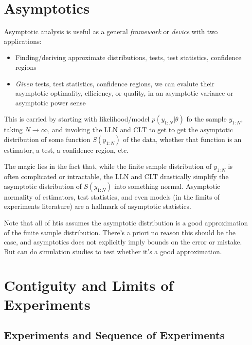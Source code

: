 \documentclass[12pt]{article}
\theoremstyle{plain}
\theoremstyle{definition}
\theoremstyle{remark}
\newcommand{\ra}{\rightarrow}
\begin{document}
\clearpage
\section{Asymptotics}

Asymptotic analysis is useful as a general \emph{framework} or
\emph{device} with two applications:
\begin{itemize}
  \item Finding/deriving approximate distributions, tests,
    test statistics, confidence regions
  \item \emph{Given} tests, test statistics, confidence regions,
    we can evalute their asymptotic optimality, efficiency, or quality,
    in an asymptotic variance or asymptotic power sense
\end{itemize}
This is carried by starting with likelihood/model $p(y_{1:N}|\theta)$ fo
the sample $y_{1:N}$, taking $N\ra\infty$, and invoking the LLN and CLT
to get to get the asymptotic distribution of some function $S(y_{1:N})$
of the data, whether that function is an estimator, a test, a confidence
region, etc.

The magic lies in the fact that, while the finite sample distribution of
$y_{1:N}$ is often complicated or intractable, the LLN and CLT
drastically simplify the asymptotic distribution of $S(y_{1:N})$ into
something normal. Asymptotic normality of estimators, test statistics,
and even models (in the limits of experiments literature) are a hallmark
of asymptotic statistics.

Note that all of htis assumes the asymptotic distribution is a good
approximation of the finite sample distribution.
There's a priori no reason this should be the case, and asymptotics does
not explicitly imply bounds on the error or mistake. But can do
simulation studies to test whether it's a good approximation.


\clearpage
\section{Contiguity and Limits of Experiments}

\subsection{Experiments and Sequence of Experiments}
\end{document}
